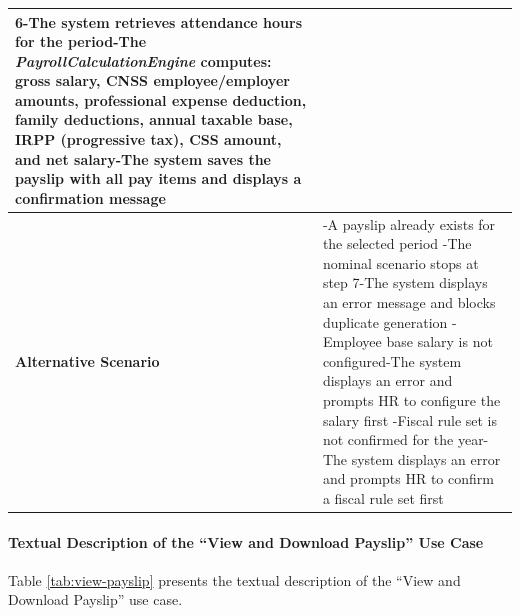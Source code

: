 \begin{longtable}{|p{}|p{}|}
6-The system retrieves attendance hours for the period\newline
7-The \textit{PayrollCalculationEngine} computes: gross salary, CNSS employee/employer amounts, professional expense deduction, family deductions, annual taxable base, IRPP (progressive tax), CSS amount, and net salary\newline
8-The system saves the payslip with all pay items and displays a confirmation message \\ \hline
    \textbf{Alternative Scenario}
    & -A payslip already exists for the selected period\newline
-The nominal scenario stops at step 7\newline
1-The system displays an error message and blocks duplicate generation\newline
\newline
-Employee base salary is not configured\newline
1-The system displays an error and prompts HR to configure the salary first\newline
\newline
-Fiscal rule set is not confirmed for the year\newline
1-The system displays an error and prompts HR to confirm a fiscal rule set first \\ \hline
\end{longtable}

\paragraph{Textual Description of the ``View and Download Payslip'' Use Case}
Table \ref{tab:view-payslip} presents the textual description of the ``View and Download Payslip'' use case.

